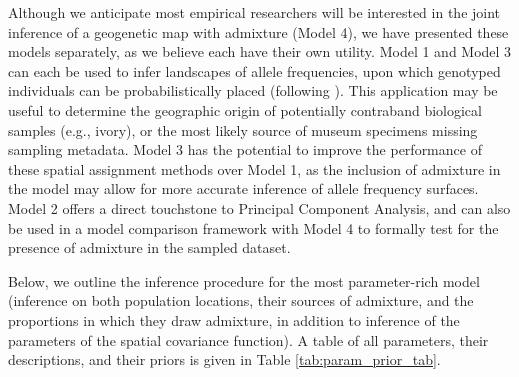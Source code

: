 \documentclass[10pt,letterpaper]{article}
\begin{document}
Although we anticipate most empirical researchers will be interested in the joint inference of a geogenetic map with admixture (Model 4), we have presented these models separately, as we believe each have their own utility.  Model 1 and Model 3 can each be used to infer landscapes of allele frequencies, upon which genotyped individuals can be probabilistically placed (following \cite{Wasser2004}).  This application may be useful to determine the geographic origin of potentially contraband biological samples (e.g., ivory), or the most likely source of museum specimens missing sampling metadata.  Model 3 has the potential to improve the performance of these spatial assignment methods over Model 1, as the inclusion of admixture in the model may allow for more accurate inference of allele frequency surfaces.  Model 2 offers a direct touchstone to Principal Component Analysis, and can also be used in a model comparison framework with Model 4 to formally test for the presence of admixture in the sampled dataset.

Below, we outline the inference procedure for the most parameter-rich model (inference on both population locations, their sources of admixture, and the proportions in which they draw admixture, in addition to inference of the parameters of the spatial covariance function).
A table of all parameters, their descriptions, and their priors is given in Table \ref{tab:param_prior_tab}.
\end{document}

